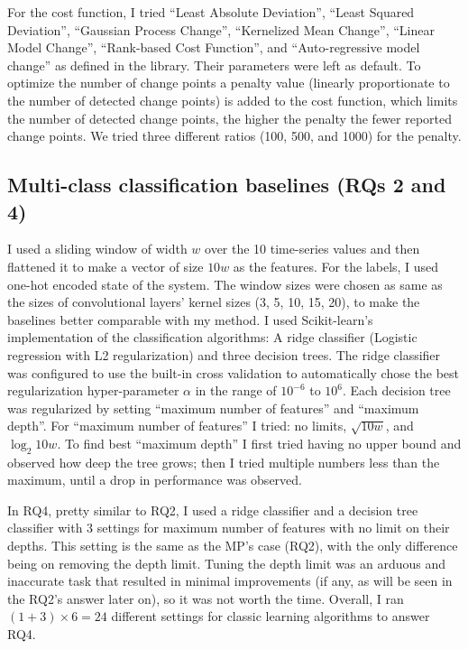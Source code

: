 For the cost function, I tried ``Least Absolute Deviation'', ``Least Squared Deviation'', ``Gaussian Process Change'', ``Kernelized Mean Change'', ``Linear Model Change'', ``Rank-based Cost Function'', and ``Auto-regressive model change'' as defined in the library. Their parameters were left as default.
To optimize the number of change points a penalty value (linearly proportionate to the number of detected change points) is added to the cost function, which limits the number of detected change points, the higher the penalty the fewer reported change points. We tried three different ratios (100, 500, and 1000) for the penalty.

\subsection{Multi-class classification baselines (RQs 2 and 4)}
I used a sliding window of width $w$ over the 10 time-series values and then flattened it to make a vector of size $10w$ as the features. For the labels, I used one-hot encoded state of the system.
The window sizes were chosen as same as the sizes of convolutional layers' kernel sizes (3, 5, 10, 15, 20), to make the baselines better comparable with my method. 
I used Scikit-learn's implementation of the classification algorithms: A ridge classifier (Logistic regression with L2 regularization) and three decision trees. The ridge classifier was configured to use the built-in cross validation to automatically chose the best regularization hyper-parameter $\alpha$ in the range of $10^{-6}$ to $10^6$. Each decision tree was regularized by setting ``maximum number of features'' and ``maximum depth''. For ``maximum number of features'' I tried: no limits, $\sqrt{10w}$, and $\log_2{10w}$. To find best ``maximum depth'' I first tried having no upper bound and observed how deep the tree grows; then I tried multiple numbers less than the maximum, until a drop in performance was observed. 

In RQ4, pretty similar to RQ2, I used a ridge classifier and a decision tree classifier with 3 settings for maximum number of features with no limit on their depths. This setting is the same as the MP's case (RQ2), with the only difference being on removing the depth limit. Tuning the depth limit was an arduous and inaccurate task that resulted in minimal improvements (if any, as will be seen in the RQ2's answer later on), so it was not worth the time. Overall, I ran $(1+3)\times6=24$ different settings for classic learning algorithms to answer RQ4. 



